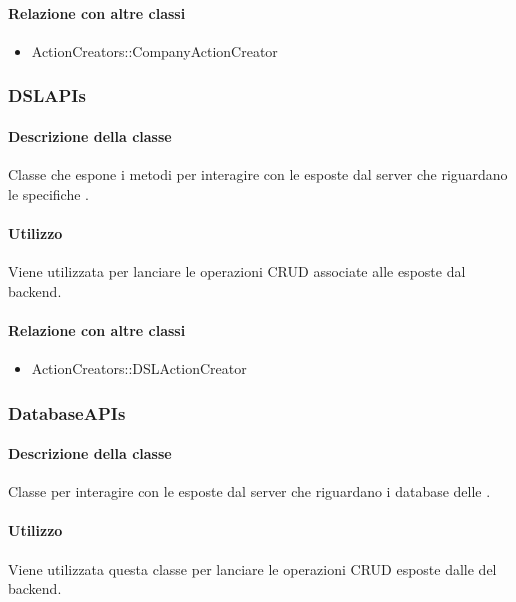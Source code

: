 \paragraph*{Relazione con altre classi}
\begin{itemize}
\item ActionCreators::CompanyActionCreator
\end{itemize}

\subsubsection{DSLAPIs}
\paragraph*{Descrizione della classe}
Classe che espone i metodi per interagire con le  esposte dal server che riguardano le specifiche .

\paragraph*{Utilizzo}
Viene utilizzata per lanciare le operazioni CRUD associate alle  esposte dal backend.

\paragraph*{Relazione con altre classi}
\begin{itemize}
\item ActionCreators::DSLActionCreator
\end{itemize}

\subsubsection{DatabaseAPIs}
\paragraph*{Descrizione della classe}
Classe per interagire con le  esposte dal server che riguardano i database delle .

\paragraph*{Utilizzo}
Viene utilizzata questa classe per lanciare le operazioni CRUD esposte dalle  del backend.


